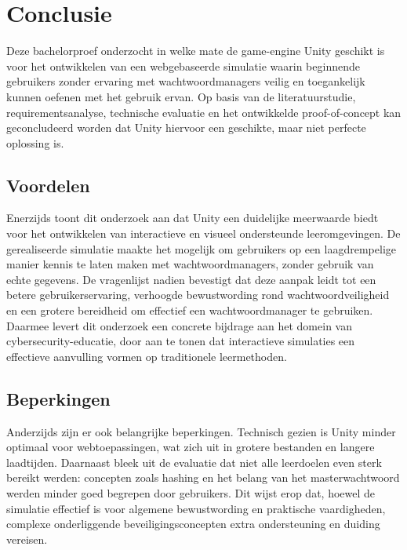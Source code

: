 
\chapter{Conclusie}%
\label{ch:conclusie}

Deze bachelorproef onderzocht in welke mate de game-engine Unity geschikt is voor het ontwikkelen van een webgebaseerde simulatie waarin beginnende gebruikers zonder ervaring met wachtwoordmanagers veilig en toegankelijk kunnen oefenen met het gebruik ervan. Op basis van de literatuurstudie, requirementsanalyse, technische evaluatie en het ontwikkelde proof-of-concept kan geconcludeerd worden dat Unity hiervoor een geschikte, maar niet perfecte oplossing is.

\section{Voordelen}
Enerzijds toont dit onderzoek aan dat Unity een duidelijke meerwaarde biedt voor het ontwikkelen van interactieve en visueel ondersteunde leeromgevingen. De gerealiseerde simulatie maakte het mogelijk om gebruikers op een laagdrempelige manier kennis te laten maken met wachtwoordmanagers, zonder gebruik van echte gegevens. De vragenlijst nadien bevestigt dat deze aanpak leidt tot een betere gebruikerservaring, verhoogde bewustwording rond wachtwoordveiligheid en een grotere bereidheid om effectief een wachtwoordmanager te gebruiken. Daarmee levert dit onderzoek een concrete bijdrage aan het domein van cybersecurity-educatie, door aan te tonen dat interactieve simulaties een effectieve aanvulling vormen op traditionele leermethoden.

\section{Beperkingen}
Anderzijds zijn er ook belangrijke beperkingen. Technisch gezien is Unity minder optimaal voor webtoepassingen, wat zich uit in grotere bestanden en langere laadtijden. Daarnaast bleek uit de evaluatie dat niet alle leerdoelen even sterk bereikt werden: concepten zoals hashing en het belang van het masterwachtwoord werden minder goed begrepen door gebruikers. Dit wijst erop dat, hoewel de simulatie effectief is voor algemene bewustwording en praktische vaardigheden, complexe onderliggende beveiligingsconcepten extra ondersteuning en duiding vereisen.

